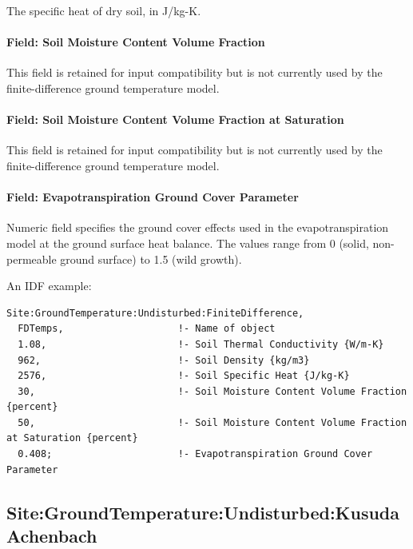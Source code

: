The specific heat of dry soil, in J/kg-K.

\paragraph{Field: Soil Moisture Content Volume Fraction}\label{field-soil-moisture-content-volume-fraction}

This field is retained for input compatibility but is not currently used by the finite-difference ground temperature model.

\paragraph{Field: Soil Moisture Content Volume Fraction at Saturation}\label{field-soil-moisture-content-volume-fraction-at-saturation}

This field is retained for input compatibility but is not currently used by the finite-difference ground temperature model.

\paragraph{Field: Evapotranspiration Ground Cover Parameter}\label{field-evapotranspiration-ground-cover-parameter}

Numeric field specifies the ground cover effects used in the evapotranspiration model at the ground surface heat balance. The values range from 0 (solid, non-permeable ground surface) to 1.5 (wild growth).

An IDF example:

\begin{lstlisting}
Site:GroundTemperature:Undisturbed:FiniteDifference,
  FDTemps,                    !- Name of object
  1.08,                       !- Soil Thermal Conductivity {W/m-K}
  962,                        !- Soil Density {kg/m3}
  2576,                       !- Soil Specific Heat {J/kg-K}
  30,                         !- Soil Moisture Content Volume Fraction {percent}
  50,                         !- Soil Moisture Content Volume Fraction at Saturation {percent}
  0.408;                      !- Evapotranspiration Ground Cover Parameter
\end{lstlisting}

\subsection{Site:GroundTemperature:Undisturbed:KusudaAchenbach}\label{sitegroundtemperatureundisturbedkusudaachenbach}

